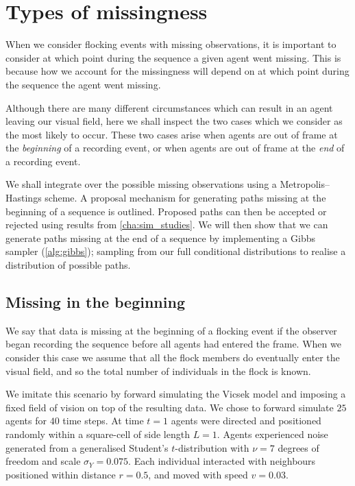 \section{Types of missingness}
\label{sec:missing_types}

When we consider flocking events with missing observations, it is important to
consider at which point during the sequence a given agent went missing. This is
because how we account for the missingness will depend on at which point during
the sequence the agent went missing.

Although there are many different circumstances which can result in an agent
leaving our visual field, here we shall inspect the two cases which we consider
as the most likely to occur. These two cases arise when agents are out of frame
at the \emph{beginning} of a recording event, or when agents are out of frame
at the \emph{end} of a recording event.

We shall integrate over the possible missing observations using a
Metropolis--Hastings scheme. A proposal mechanism for generating paths missing
at the beginning of a sequence is outlined. Proposed paths can then be accepted
or rejected using results from \cref{cha:sim_studies}. We will then show that
we can generate paths missing at the end of a sequence by implementing a Gibbs
sampler (\cref{alg:gibbs}); sampling from our full conditional distributions to
realise a distribution of possible paths.

\subsection{Missing in the beginning}
\label{ssec:beg_missing}

We say that data is missing at the beginning of a flocking event if the
observer began recording the sequence before all agents had entered the frame.
When we consider this case we assume that all the flock members do eventually
enter the visual field, and so the total number of individuals in the flock is
known.

We imitate this scenario by forward simulating the Vicsek model and imposing a
fixed field of vision on top of the resulting data. We chose to forward
simulate $25$ agents for $40$ time steps. At time $t=1$ agents were directed
and positioned randomly within a square-cell of side length $L=1$. Agents
experienced noise generated from a generalised Student's $t$-distribution with
$\nu=7$ degrees of freedom and scale $\sigma_Y=0.075$. Each individual
interacted with neighbours positioned within distance $r=0.5$, and moved with
speed $v=0.03$.

